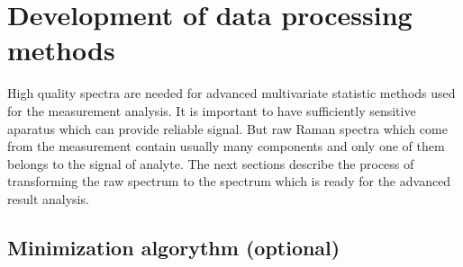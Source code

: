 \section{Development of data processing methods}

High quality spectra are needed for advanced multivariate statistic methods
used for the measurement analysis.
It is important to have sufficiently sensitive aparatus which can provide
reliable signal.
But raw Raman spectra which come from the measurement contain usually many
components and only one of them belongs to the signal of analyte.
The next sections describe the process of transforming the raw spectrum
to the spectrum which is ready for the advanced result analysis.







\subsection{Minimization algorythm (optional)}




